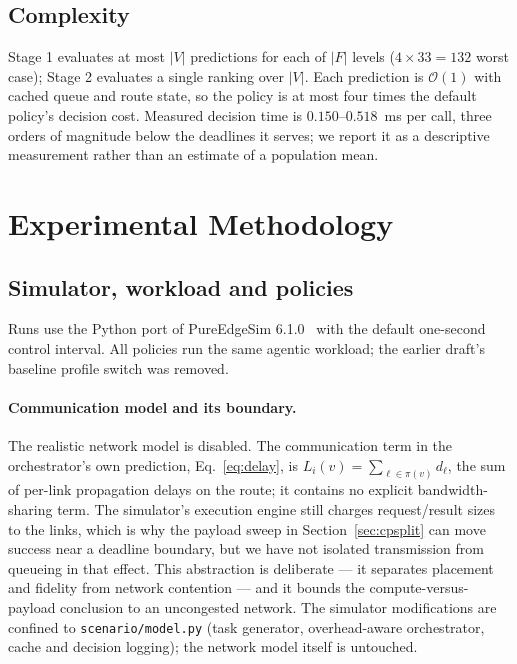 \documentclass[journal,10pt]{IEEEtran}
\newcommand{\bigO}{\ensuremath{\mathcal{O}}}
\begin{document}
\subsection{Complexity}
Stage 1 evaluates at most $|V|$ predictions for each of $|F|$ levels ($4\times33=
132$ worst case); Stage 2 evaluates a single ranking over $|V|$. Each prediction
is $\bigO(1)$ with cached queue and route state, so the policy is at most four
times the default policy's decision cost. Measured decision time is
$0.150$--$0.518$~ms per call, three orders of magnitude below the deadlines it
serves; we report it as a descriptive measurement rather than an estimate of a
population mean.

\section{Experimental Methodology}
\label{sec:exp}

\subsection{Simulator, workload and policies}
Runs use the Python port of PureEdgeSim 6.1.0~\cite{mechalikh2021pureedgesim}
with the default one-second control interval. All policies run the same agentic
workload; the earlier draft's baseline profile switch was removed.

\paragraph{Communication model and its boundary.}
The realistic network model is disabled. The communication term in the
orchestrator's own prediction, Eq.~\eqref{eq:delay}, is
$L_i(v)=\sum_{\ell\in\pi(v)}d_\ell$, the sum of per-link propagation delays on
the route; it contains no explicit bandwidth-sharing term. The simulator's
execution engine still charges request/result sizes to the links, which is why
the payload sweep in Section~\ref{sec:cpsplit} can move success near a deadline
boundary, but we have not isolated transmission from queueing in that effect.
This abstraction is deliberate --- it separates placement and fidelity from
network contention --- and it bounds the compute-versus-payload conclusion to an
uncongested network. The simulator modifications are confined to
\texttt{scenario/model.py} (task generator, overhead-aware orchestrator, cache
and decision logging); the network model itself is untouched.
\end{document}
